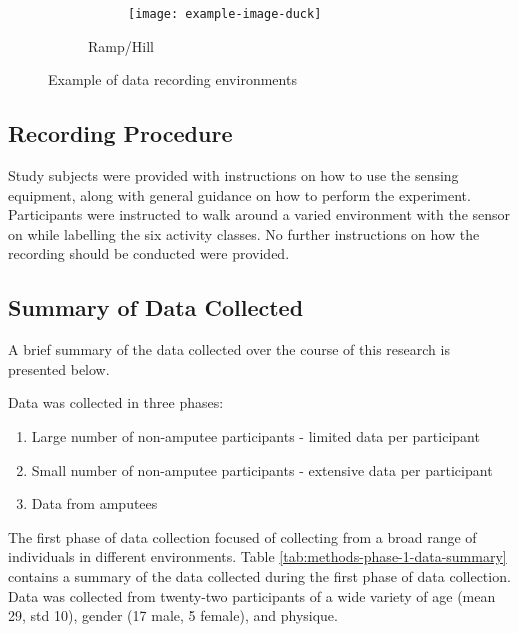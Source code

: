 \begin{figure}[!hbtp]
\begin{subfigure}[b]{\textwidth}
\begin{subfigure}[b]{0.32\textwidth}
        \end{subfigure}
        \hfill
        \begin{subfigure}[b]{0.32\textwidth}
             \centering
             \texttt{[image: example-image-duck]}
        \end{subfigure}
        \caption{Ramp/Hill}
        \label{fig:methods-ramp-example}
      \end{subfigure}
    \caption{Example of data recording environments}
    \label{fig:methods-example-enviroments}
\end{figure}

\subsection{Recording Procedure} %
Study subjects were provided with instructions on how to use the sensing equipment, along with general guidance on how to perform the experiment. Participants were instructed to walk around a varied environment with the sensor on while labelling the six activity classes. No further instructions on how the recording should be conducted were provided.

\subsection{Summary of Data Collected} %
A brief summary of the data collected over the course of this research is presented below.

Data was collected in three phases:
\begin{enumerate}
    \item Large number of non-amputee participants - limited data per participant
    \item Small number of non-amputee participants - extensive data per participant
    \item Data from amputees
\end{enumerate}

The first phase of data collection focused of collecting from a broad range of individuals in different environments. Table \ref{tab:methods-phase-1-data-summary} contains a summary of the data collected during the first phase of data collection. Data was collected from twenty-two participants of a wide variety of age (mean 29, std 10), gender (17 male, 5 female), and physique.

